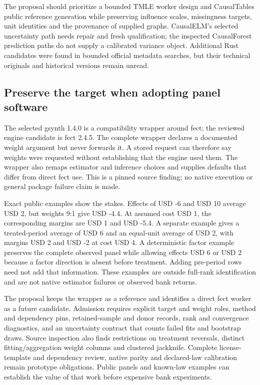 The proposal should prioritize a bounded TMLE worker design and
CausalTables public reference generation while preserving influence
scales, missingness targets, unit identities and the provenance of
supplied graphs. CausalELM's selected uncertainty path needs repair and
fresh qualification; the inspected CausalForest prediction paths do not
supply a calibrated variance object. Additional Rust candidates were
found in bounded official metadata searches, but their technical
originals and historical versions remain unread.
\cite{exec21_effects_discovery}

\hypertarget{preserve-the-target-when-adopting-panel-software}{%
\subsection{Preserve the target when adopting panel
software}\label{preserve-the-target-when-adopting-panel-software}}

The selected gsynth 1.4.0 is a compatibility wrapper around fect; the
reviewed engine candidate is fect 2.4.5. The complete wrapper declares a
documented weight argument but never forwards it. A stored request can
therefore say weights were requested without establishing that the
engine used them. The wrapper also remaps estimator and inference
choices and supplies defaults that differ from direct fect use. This is
a pinned source finding; no native execution or general package failure
claim is made. \cite{exec21_gsynth_wrapper,exec21_gsynth_engine}

Exact public examples show the stakes. Effects of USD -6 and USD 10
average USD 2, but weights 9:1 give USD -4.4. At assumed cost USD 1, the
corresponding margins are USD 1 and USD -5.4. A separate example gives a
treated-period average of USD 6 and an equal-unit average of USD 2, with
margins USD 2 and USD -2 at cost USD 4. A deterministic factor example
preserves the complete observed panel while allowing effects USD 6 or
USD 2 because a factor direction is absent before treatment. Adding
pre-period rows need not add that information. These examples are
outside full-rank identification and are not native estimator failures
or observed bank returns. \cite{exec21_gsynth_reference}

The proposal keeps the wrapper as a reference and identifies a direct
fect worker as a future candidate. Admission requires explicit target
and weight roles, method and dependency pins, retained-sample and donor
records, rank and convergence diagnostics, and an uncertainty contract
that counts failed fits and bootstrap draws. Source inspection also
finds restrictions on treatment reversals, distinct fitting/aggregation
weight columns and clustered jackknife. Complete license-template and
dependency review, native parity and declared-law calibration remain
prototype obligations. Public panels and known-law examples can
establish the value of that work before expensive bank experiments.

